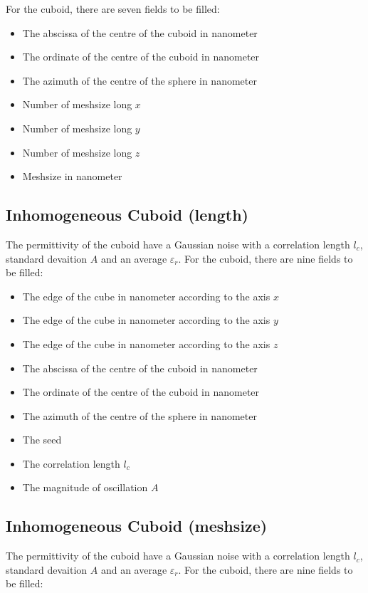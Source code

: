 For the cuboid, there are seven fields to be filled:

\begin{itemize}
\item The abscissa of the centre of the cuboid in nanometer
\item The ordinate of the centre of the cuboid in nanometer
\item The azimuth of the centre of the sphere in nanometer
\item Number of meshsize long $x$
\item Number of meshsize long $y$
\item Number of meshsize long $z$
\item Meshsize in nanometer
\end{itemize}


\subsection{Inhomogeneous Cuboid (length)}


The permittivity of the cuboid have a Gaussian noise with a
correlation length $l_c$, standard devaition $A$ and an average
$\varepsilon_r$.  For the cuboid, there are nine fields to be filled:

\begin{itemize}
\item The edge of the cube in nanometer according to the axis $x$
\item The edge of the cube in nanometer according to the axis $y$
\item The edge of the cube in nanometer according to the axis $z$
\item The abscissa of the centre of the cuboid in nanometer
\item The ordinate of the centre of the cuboid in nanometer
\item The azimuth of the centre of the sphere in nanometer
\item The seed
\item The correlation length $l_c$
\item The magnitude of oscillation $A$

\end{itemize}


\subsection{Inhomogeneous Cuboid (meshsize)}


The permittivity of the cuboid have a Gaussian noise with a
correlation length $l_c$, standard devaition $A$ and an average
$\varepsilon_r$.  For the cuboid, there are nine fields to be filled:

